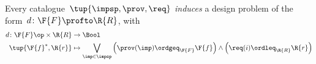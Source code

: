 \begin{definition}
    Every catalogue~$\tup{\impsp,\prov,\req}$ \emph{induces} a design problem of the form~$d\colon \F{F}\profto \R{R}$, with
    \begin{equation*}
        \begin{aligned}
            d\colon \F{F}\op \times \R{R}&\to \Bool\\
            \tup{\F{f}^*,\R{r}}&\mapsto \bigvee_{\imp\in \impsp}\left(\prov(\imp)\ordgeq_{\F{F}}\F{f} \right)\wedge \left( \req(i)\ordleq_{\R{R}}\R{r}\right)
        \end{aligned}
    \end{equation*}
\end{definition}
